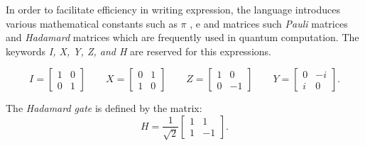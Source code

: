 In order to facilitate efficiency in writing expression, the language introduces various mathematical constants such as $\pi$ , $\mathrm{e}$ and matrices such  \emph{Pauli} matrices and \emph{Hadamard} matrices which are frequently used in quantum computation. The keywords \emph{I, X, Y, Z, and  H} are reserved for this expressions.

\[
I =
\begin{bmatrix}
 1 & 0  \\
 0 & 1  
\end{bmatrix}
\qquad
X =
\begin{bmatrix}
 0 & 1  \\
 1 & 0  
\end{bmatrix}
\qquad
Z =
\begin{bmatrix}
 1 & 0  \\
 0 & -1  
\end{bmatrix}
\qquad
Y =
\begin{bmatrix}
 0 & -i  \\
 i & 0  
\end{bmatrix}.
\]

The \emph{Hadamard gate} is defined by the matrix:
\[
H= \frac{1}{\sqrt{2}}\begin{bmatrix}
 1 & 1  \\
 1 & -1
\end{bmatrix}.
\]
